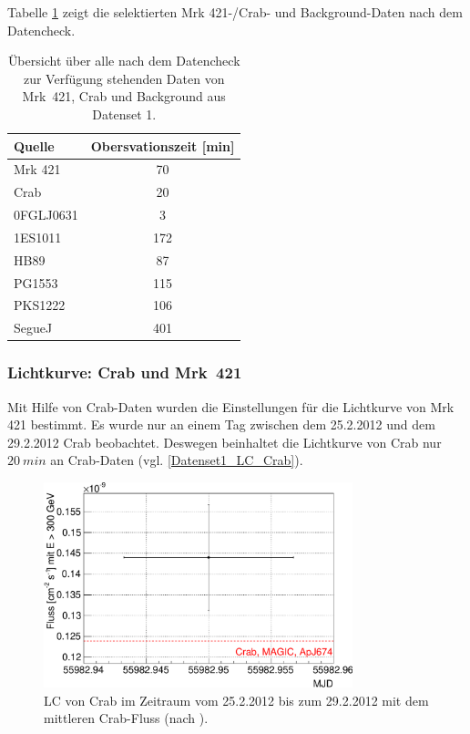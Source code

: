 Tabelle \ref{tab:Datenset1} zeigt die selektierten Mrk 421-/Crab- und Background-Daten nach dem Datencheck.


\begin{table}[!h]
\centering
\caption{Übersicht über alle nach dem Datencheck zur Verfügung stehenden Daten von Mrk~421, Crab und Background aus Datenset 1.}
\label{tab:Datenset1}
\begin{tabular}{lc}
  \toprule
  Quelle & Obersvationszeit [min]\\
  \midrule
  \midrule
  Mrk 421 & 70\\
  \midrule
  Crab & 20\\
  \midrule
  0FGLJ0631 & 3 \\
  1ES1011 & 172 \\
  HB89 & 87 \\
  PG1553 & 115 \\
  PKS1222 & 106 \\
  SegueJ & 401 \\
  \bottomrule
  \bottomrule
\end{tabular}
\end{table}

\subsubsection{Lichtkurve: Crab und Mrk~421}
Mit Hilfe von Crab-Daten wurden die Einstellungen für die Lichtkurve von Mrk 421 bestimmt.
Es wurde nur an einem Tag zwischen dem 25.2.2012 und dem 29.2.2012 Crab beobachtet.
Deswegen beinhaltet die Lichtkurve von Crab nur $\SI{20}{min}$ an Crab-Daten (vgl. \autoref{Datenset1_LC_Crab}).

\begin{figure}
    \centering
    \includegraphics[width=0.8\textwidth]{./Plots/04_MrkAnalyse/Datenset1/Datenset1_LC_Crab.pdf}
    \caption{LC von Crab im Zeitraum vom 25.2.2012 bis zum 29.2.2012 mit dem mittleren Crab-Fluss (nach \cite{LiteraturreferenzMAGIC}).}
    \label{Datenset1_LC_Crab}
\end{figure}

